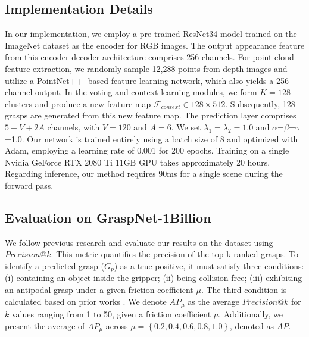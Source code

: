 \subsection{Implementation Details}
\label{sec:implement}


In our implementation, we employ a pre-trained ResNet34 model trained on the ImageNet dataset as the encoder for RGB images. The output appearance feature from this encoder-decoder architecture comprises 256 channels. For point cloud feature extraction, we randomly sample 12,288 points from depth images and utilize a PointNet++ \cite{qi2017pointnet++}-based feature learning network, which also yields a 256-channel output. In the voting and context learning modules, we form $K=128$ clusters and produce a new feature map $\mathcal{F}_{context} \in 128 \times 512$. Subsequently, 128 grasps are generated from this new feature map. The prediction layer comprises $5 + V + 2A$ channels, with $V=120$ and $A=6$. We set $\lambda_{1}=\lambda_{2}=1.0$ and $\alpha$=$\beta$=$\gamma$=1.0. Our network is trained entirely using a batch size of 8 and optimized with Adam, employing a learning rate of 0.001 for 200 epochs. Training on a single Nvidia GeForce RTX 2080 Ti 11GB GPU takes approximately 20 hours. Regarding inference, our method requires 90ms for a single scene during the forward pass.

\subsection{Evaluation on GraspNet-1Billion}

We follow previous research \cite{fang2020graspnet} and evaluate our results on the dataset using $Precision@k$. This metric quantifies the precision of the top-k ranked grasps. To identify a predicted grasp ($G_{p}$) as a true positive, it must satisfy three conditions: (i) containing an object inside the gripper; (ii) being collision-free; (iii) exhibiting an antipodal grasp under a given friction coefficient $\mu$. The third condition is calculated based on prior works \cite{ten2017grasp, fang2020graspnet}. We denote $AP_{\mu}$ as the average $Precision@k$ for $k$ values ranging from 1 to 50, given a friction coefficient $\mu$. Additionally, we present the average of $AP_{\mu}$ across $\mu = \left\lbrace 0.2,0.4,0.6,0.8,1.0 \right\rbrace $, denoted as $AP$.


